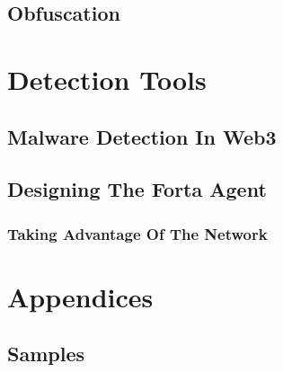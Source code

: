 \documentclass[11pt,fleqn,oneside]{book} %
\begin{document}
\chapter{Obfuscation} \label{ch:foreseen-obfuscation}



\part{Detection Tools}
\chapter{Malware Detection In Web3} \label{ch:transposing-to-web3}



\chapter{Designing The Forta Agent} \label{ch:forta-agent}
\section{Taking Advantage Of The Network} \label{sec:}

\renewcommand{\thechapter}{\Alph{chapter}}
\renewcommand{\thesection}{\Alph{chapter}.\Roman{section}}
\renewcommand{\thesubsection}{\Alph{chapter}.\Roman{section}.\alph{subsection}}
\part{Appendices}
\chapter{Samples}

\newpage\printbibliography[title = {Resources}]
\end{document}
